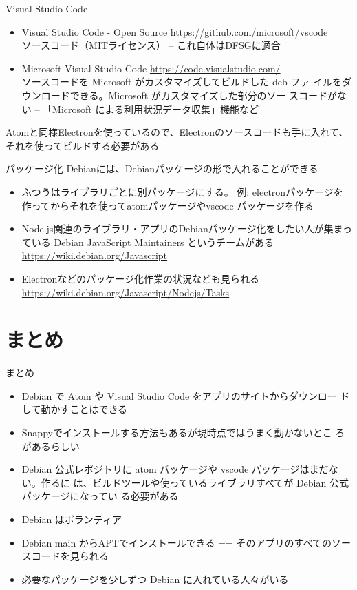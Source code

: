 \begin{frame}{Visual Studio Code}
\begin{itemize}[<+->]
 \item Visual Studio Code - Open Source
       \url{https://github.com/microsoft/vscode}\\
       ソースコード（MITライセンス） -- これ自体はDFSGに適合
 \item Microsoft Visual Studio Code \url{https://code.visualstudio.com/}\\
       ソースコードを Microsoft がカスタマイズしてビルドした deb ファ
       イルをダウンロードできる。Microsoft がカスタマイズした部分のソー
       スコードがない -- 「Microsoft による利用状況データ収集」機能など
\end{itemize}

 \pause
 Atomと同様Electronを使っているので、Electronのソースコードも手に入れて、
 それを使ってビルドする必要がある
\end{frame}

  \begin{frame}{パッケージ化}
Debianには、Debianパッケージの形で入れることができる
\begin{itemize}
 \item    ふつうはライブラリごとに別パッケージにする。
   例: electronパッケージを作ってからそれを使ってatomパッケージやvscode
   パッケージを作る
 \item Node.js関連のライブラリ・アプリのDebianパッケージ化をしたい人が集まっ
   ている Debian JavaScript Maintainers というチームがある
   \url{https://wiki.debian.org/Javascript}
 \item    Electronなどのパッケージ化作業の状況なども見られる
   \url{https://wiki.debian.org/Javascript/Nodejs/Tasks}
\end{itemize}

  \end{frame}


\section{まとめ}
\begin{frame}[containsverbatim]{まとめ}
\begin{itemize}
 \item Debian で Atom や Visual Studio Code をアプリのサイトからダウンロー
       ドして動かすことはできる
 \item Snappyでインストールする方法もあるが現時点ではうまく動かないとこ
       ろがあるらしい
 \item Debian 公式レポジトリに atom パッケージや vscode パッケージはまだない。作るに
       は、ビルドツールや使っているライブラリすべてが Debian 公式パッケージになってい
       る必要がある
 \item Debian はボランティア
 \item Debian main からAPTでインストールできる == そのアプリのすべてのソー
       スコードを見られる
 \item 必要なパッケージを少しずつ Debian に入れている人々がいる
\end{itemize}
\end{frame}




